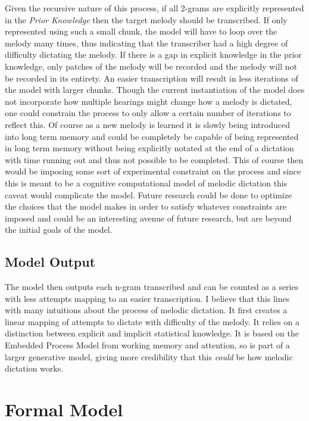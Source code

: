 \documentclass[]{book}
\theoremstyle{definition}
\theoremstyle{definition}
\theoremstyle{definition}
\theoremstyle{remark}
\begin{document}
Given the recursive nature of this process, if all 2-grams are
explicitly represented in the \emph{Prior Knowledge} then the target
melody should be transcribed. If only represented using such a small
chunk, the model will have to loop over the melody many times, thus
indicating that the transcriber had a high degree of difficulty
dictating the melody. If there is a gap in explicit knowledge in the
prior knowledge, only patches of the melody will be recorded and the
melody will not be recorded in its entirety. An easier transcription
will result in less iterations of the model with larger chunks. Though
the current instantiation of the model does not incorporate how multiple
hearings might change how a melody is dictated, one could constrain the
process to only allow a certain number of iterations to reflect this. Of
course as a new melody is learned it is slowly being introduced into
long term memory and could be completely be capable of being represented
in long term memory without being explicitly notated at the end of a
dictation with time running out and thus not possible to be completed.
This of course then would be imposing some sort of experimental
constraint on the process and since this is meant to be a cognitive
computational model of melodic dictation this caveat would complicate
the model. Future research could be done to optimize the choices that
the model makes in order to satisfy whatever constraints are imposed and
could be an interesting avenue of future research, but are beyond the
initial goals of the model.

\hypertarget{model-output}{%
\subsection{Model Output}\label{model-output}}

The model then outputs each n-gram transcribed and can be counted as a
series with less attempts mapping to an easier transcription. I believe
that this lines with many intuitions about the process of melodic
dictation. It first creates a linear mapping of attempts to dictate with
difficulty of the melody. It relies on a distinction between explicit
and implicit statistical knowledge. It is based on the Embedded Process
Model from working memory and attention, so is part of a larger
generative model, giving more credibility that this \emph{could} be how
melodic dictation works.

\hypertarget{formal-model}{%
\section{Formal Model}\label{formal-model}}
\end{document}

